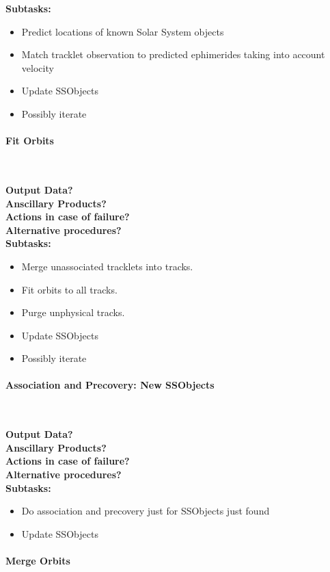 \noindent
{\bf Subtasks:}
\begin{itemize}
\item Predict locations of known Solar System objects
\item Match tracklet observation to predicted ephimerides taking into account velocity
\item Update SSObjects
\item Possibly iterate
\end{itemize}

\paragraph{Fit Orbits}~

\noindent
{\bf Output Data?}\\
{\bf Anscillary Products?}\\
{\bf Actions in case of failure?}\\
{\bf Alternative procedures?}\\

\noindent
{\bf Subtasks:}
\begin{itemize}
\item Merge unassociated tracklets into tracks.
\item Fit orbits to all tracks.
\item Purge unphysical tracks.
\item Update SSObjects
\item Possibly iterate
\end{itemize}

\paragraph{Association and Precovery: New SSObjects}~

\noindent
{\bf Output Data?}\\
{\bf Anscillary Products?}\\
{\bf Actions in case of failure?}\\
{\bf Alternative procedures?}\\

\noindent
{\bf Subtasks:}
\begin{itemize}
\item Do association and precovery just for SSObjects just found
\item Update SSObjects
\end{itemize}

\paragraph{Merge Orbits}~


